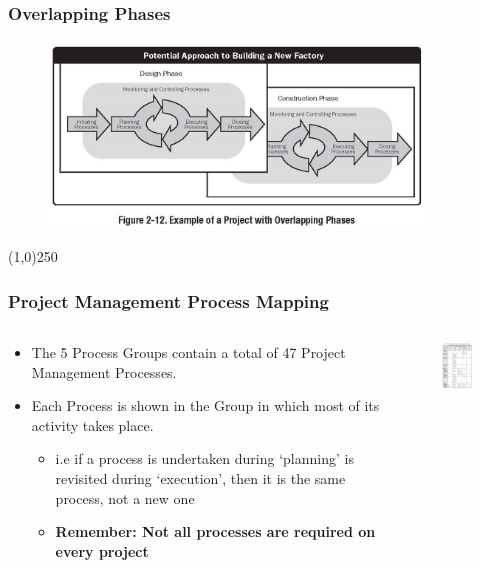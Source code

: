 \begin{frame}
\frametitle{Overlapping Phases}
 \begin{figure}
 	\centering
 		\includegraphics[width = 10cm]{images/Fig2-12.jpg}
 	\label{fig:2-12}
 \end{figure}
\end{frame}
\begin{center}\line(1,0){250}\end{center}
\begin{frame}
\frametitle{Project Management Process Mapping}
\begin{columns}
		\begin{column}{0.6\textwidth}		
			\begin{itemize}
				\item The 5 Process Groups contain a total of 47 Project Management Processes.\\
				\item Each Process is shown in the Group in which most of its activity takes place.\\
					\begin{itemize}
						\item i.e if a process is undertaken during `planning' is revisited during `execution', then it is the same process, not a new one
						\item \textbf{Remember: Not all processes are required on every project}
					\end{itemize}
			\end{itemize}
		\end{column}	
			
		\begin{column}{0.4\textwidth}	
			\begin{figure}
				\centering
					\includegraphics[width = 4cm]{images/tbl3-1.jpg}
				\label{tbl:3-1}
			\end{figure}
		\end{column}
\end{columns}

\end{frame}
